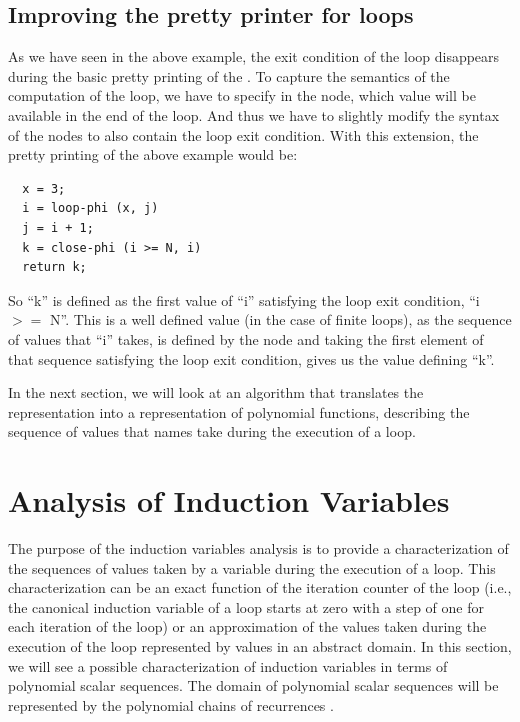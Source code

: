 \subsection{Improving the \SSA{} pretty printer for loops}

As we have seen in the above example, the exit condition of the loop
disappears during the basic pretty printing of the \SSA{}.  To capture
the semantics of the computation of the loop, we have to specify in
the \closephi{} node, which value will be available in the end of the
loop.  And thus we have to slightly modify the syntax of the
\closephi{} nodes to also contain the loop exit condition.  With this
extension, the \SSA{} pretty printing of the above example would be:
\begin{verbatim}
  x = 3;
  i = loop-phi (x, j)
  j = i + 1;
  k = close-phi (i >= N, i)
  return k;
\end{verbatim}
So ``k'' is defined as the first value of ``i'' satisfying the loop
exit condition, ``i $>=$ N''.  This is a well defined value (in the
case of finite loops), as the sequence of values that ``i'' takes, is
defined by the \loopphi{} node and taking the first element of that
sequence satisfying the loop exit condition, gives us the value
defining ``k''.

In the next section, we will look at an algorithm that translates the
\SSA{} representation into a representation of polynomial functions,
describing the sequence of values that \SSA{} names take during the
execution of a loop.

\section{Analysis of Induction Variables}

The purpose of the induction variables analysis is to provide a
characterization of the sequences of values taken by a variable during
the execution of a loop.  This characterization can be an exact
function of the iteration counter of the loop (i.e., the canonical
induction variable of a loop starts at zero with a step of one for
each iteration of the loop) or an approximation of the values taken
during the execution of the loop represented by values in an abstract
domain.  In this section, we will see a possible characterization of
induction variables in terms of polynomial scalar sequences.  The
domain of polynomial scalar sequences will be represented by the
polynomial chains of recurrences \cite{BWZ94,KMZ98,Zim01}.

